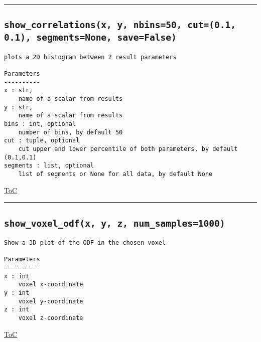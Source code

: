 \documentclass{article}
\begin{document}


\vspace{5mm}

\hrule

\subsection*{\texttt{show\_correlations(x, y, nbins=50, cut=(0.1, 0.1), segments=None, save=False)}}

\begin{lstlisting}[language=docstring]
plots a 2D histogram between 2 result parameters

Parameters
----------
x : str,
    name of a scalar from results
y : str,
    name of a scalar from results
bins : int, optional
    number of bins, by default 50
cut : tuple, optional
    cut upper and lower percentile of both parameters, by default (0.1,0.1)
segments : list, optional
    list of segments or None for all data, by default None
\end{lstlisting}

\begin{flushright}

\hyperref[toc]{ToC}

\end{flushright}



\vspace{5mm}

\hrule

\subsection*{\texttt{show\_voxel\_odf(x, y, z, num\_samples=1000)}}

\begin{lstlisting}[language=docstring]
Show a 3D plot of the ODF in the chosen voxel

Parameters
----------
x : int
    voxel x-coordinate
y : int
    voxel y-coordinate
z : int
    voxel z-coordinate
\end{lstlisting}

\begin{flushright}

\hyperref[toc]{ToC}

\end{flushright}
\end{document}
